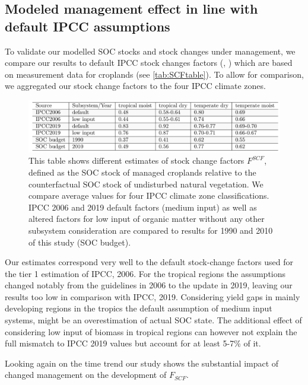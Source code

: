 \documentclass[gc, manuscript]{copernicus}
\begin{document}
\hypertarget{modeled-management-effect-in-line-with-default-ipcc-assumptions}{%
\subsection{Modeled management effect in line with default IPCC assumptions}\label{modeled-management-effect-in-line-with-default-ipcc-assumptions}}

To validate our modelled SOC stocks and stock changes under management, we compare our results to default IPCC stock changes factors (\citet{ipcc_2006_2006}, \citet{ipcc_2019_2019}) which are based on measurement data for croplands (see \ref{tab:SCFtable}). To allow for comparison, we aggregated our stock change factors to the four IPCC climate zones.

\begin{figure}
\includegraphics[width=16cm]{../ResultNotebooks/Output/Images/TableSCF_comparison} \caption{This table shows different estimates of stock change factors $F^{SCF}$, defined as the SOC stock of managed croplands relative to the counterfactual SOC stock of undisturbed natural vegetation. We compare average values for four IPCC climate zone classifications. IPCC 2006 and 2019 default factors (medium input) as well as altered factors for low input of organic matter without any other subsystem consideration are compared to results for 1990 and 2010 of this study (SOC budget).}\label{fig:SCFtable}
\end{figure}

Our estimates correspond very well to the default stock-change factors used for the tier 1 estimation of IPCC, 2006. For the tropical regions the assumptions changed notably from the guidelines in 2006 to the update in 2019, leaving our results too low in comparison with IPCC, 2019. Considering yield gaps in mainly developing regions in the tropics the default assumption of medium input systems, might be an overestimation of actual SOC state. The additional effect of considering low input of biomass in tropical regions can however not explain the full mismatch to IPCC 2019 values but account for at least 5-7\% of it.

Looking again on the time trend our study shows the substantial impact of changed management on the development of \(F_{SCF}\).
\end{document}
